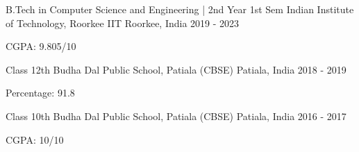 

\begin{cventries}

  \cventry
    {B.Tech in Computer Science and Engineering | 2nd Year 1st Sem} %
    {Indian Institute of Technology, Roorkee} %
    {IIT Roorkee, India} %
    {2019 - 2023} %
    {
      \begin{cvitems} %
        \item {CGPA: 9.805/10}
      \end{cvitems}
    }

  \cventry
    {Class 12th} %
    {Budha Dal Public School, Patiala (CBSE)} %
    {Patiala, India} %
    {2018 - 2019} %
    {
      \begin{cvitems} %
        \item {Percentage: 91.8}
      \end{cvitems}
    }

  \cventry
    {Class 10th} %
    {Budha Dal Public School, Patiala (CBSE)} %
    {Patiala, India} %
    {2016 - 2017} %
    {
      \begin{cvitems} %
        \item {CGPA: 10/10}
      \end{cvitems}
    }

\end{cventries}